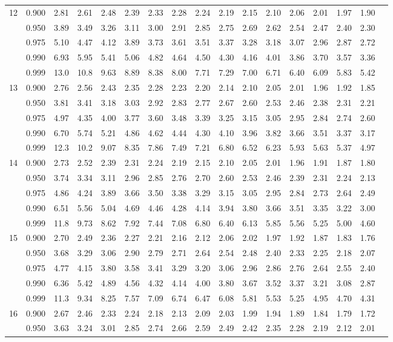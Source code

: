 \documentclass[pdftex,11pt,openany]{book}\usepackage[]{graphicx}\usepackage[]{color}
\begin{document}
{\begin{center}
\begin{tabular}{rrr@{\,}r@{\,}r@{\,}r@{\,}r@{\,}r@{\,}r@{\,}r
                   @{\,}r@{\,}r@{\,}r@{\,}r@{\,}r@{\,}r@{\,}r}
12&0.900&2.81&2.61&2.48&2.39&2.33&2.28&2.24&2.19&2.15&2.10&2.06&2.01&1.97&1.90\\
  &0.950&3.89&3.49&3.26&3.11&3.00&2.91&2.85&2.75&2.69&2.62&2.54&2.47&2.40&2.30\\
  &0.975&5.10&4.47&4.12&3.89&3.73&3.61&3.51&3.37&3.28&3.18&3.07&2.96&2.87&2.72\\
  &0.990&6.93&5.95&5.41&5.06&4.82&4.64&4.50&4.30&4.16&4.01&3.86&3.70&3.57&3.36\\
  &0.999&13.0&10.8&9.63&8.89&8.38&8.00&7.71&7.29&7.00&6.71&6.40&6.09&5.83&5.42\\
13&0.900&2.76&2.56&2.43&2.35&2.28&2.23&2.20&2.14&2.10&2.05&2.01&1.96&1.92&1.85\\
  &0.950&3.81&3.41&3.18&3.03&2.92&2.83&2.77&2.67&2.60&2.53&2.46&2.38&2.31&2.21\\
  &0.975&4.97&4.35&4.00&3.77&3.60&3.48&3.39&3.25&3.15&3.05&2.95&2.84&2.74&2.60\\
  &0.990&6.70&5.74&5.21&4.86&4.62&4.44&4.30&4.10&3.96&3.82&3.66&3.51&3.37&3.17\\
  &0.999&12.3&10.2&9.07&8.35&7.86&7.49&7.21&6.80&6.52&6.23&5.93&5.63&5.37&4.97\\
14&0.900&2.73&2.52&2.39&2.31&2.24&2.19&2.15&2.10&2.05&2.01&1.96&1.91&1.87&1.80\\
  &0.950&3.74&3.34&3.11&2.96&2.85&2.76&2.70&2.60&2.53&2.46&2.39&2.31&2.24&2.13\\
  &0.975&4.86&4.24&3.89&3.66&3.50&3.38&3.29&3.15&3.05&2.95&2.84&2.73&2.64&2.49\\
  &0.990&6.51&5.56&5.04&4.69&4.46&4.28&4.14&3.94&3.80&3.66&3.51&3.35&3.22&3.00\\
  &0.999&11.8&9.73&8.62&7.92&7.44&7.08&6.80&6.40&6.13&5.85&5.56&5.25&5.00&4.60\\
15&0.900&2.70&2.49&2.36&2.27&2.21&2.16&2.12&2.06&2.02&1.97&1.92&1.87&1.83&1.76\\
  &0.950&3.68&3.29&3.06&2.90&2.79&2.71&2.64&2.54&2.48&2.40&2.33&2.25&2.18&2.07\\
  &0.975&4.77&4.15&3.80&3.58&3.41&3.29&3.20&3.06&2.96&2.86&2.76&2.64&2.55&2.40\\
  &0.990&6.36&5.42&4.89&4.56&4.32&4.14&4.00&3.80&3.67&3.52&3.37&3.21&3.08&2.87\\
  &0.999&11.3&9.34&8.25&7.57&7.09&6.74&6.47&6.08&5.81&5.53&5.25&4.95&4.70&4.31\\
16&0.900&2.67&2.46&2.33&2.24&2.18&2.13&2.09&2.03&1.99&1.94&1.89&1.84&1.79&1.72\\
  &0.950&3.63&3.24&3.01&2.85&2.74&2.66&2.59&2.49&2.42&2.35&2.28&2.19&2.12&2.01\\

\end{tabular}
\end{center}}
\end{document}

